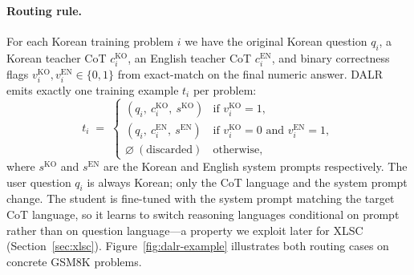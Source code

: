 \documentclass{article}
\begin{document}
\paragraph{Routing rule.}
For each Korean training problem $i$ we have the original Korean
question $q_i$, a Korean teacher CoT $c_i^{\text{KO}}$, an English
teacher CoT $c_i^{\text{EN}}$, and binary correctness flags
$v_i^{\text{KO}}, v_i^{\text{EN}} \in \{0,1\}$ from exact-match on
the final numeric answer. DALR emits exactly one training example
$t_i$ per problem:
\begin{equation}
\label{eq:dalr}
t_i \;=\;
\begin{cases}
(q_i,\ c_i^{\text{KO}},\ s^{\text{KO}}) & \text{if } v_i^{\text{KO}} = 1, \\[2pt]
(q_i,\ c_i^{\text{EN}},\ s^{\text{EN}}) & \text{if } v_i^{\text{KO}} = 0 \text{ and } v_i^{\text{EN}} = 1, \\[2pt]
\varnothing\ (\text{discarded})         & \text{otherwise},
\end{cases}
\end{equation}
where $s^{\text{KO}}$ and $s^{\text{EN}}$ are the Korean and English
system prompts respectively. The user question $q_i$ is always
Korean; only the CoT language and the system prompt change. The
student is fine-tuned with the system prompt matching the target
CoT language, so it learns to switch reasoning languages conditional
on prompt rather than on question language---a property we exploit
later for XLSC (Section~\ref{sec:xlsc}).
Figure~\ref{fig:dalr-example} illustrates both routing cases on
concrete GSM8K problems.
\end{document}
